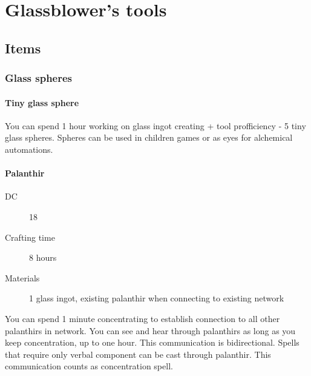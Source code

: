 \chapter{Glassblower's tools}

\section{Items}

\subsection{Glass spheres}

\subsubsection{Tiny glass sphere}

You can spend 1 hour working on glass ingot creating \sleightofhands + tool profficiency - 5 tiny glass spheres. Spheres can be used in children games or as eyes for alchemical automations.

\subsubsection{Palanthir}

\begin{description}
\item [DC] 18 \arcana
\item [Crafting time] 8 hours
\item [Materials] 1 glass ingot, existing palanthir when connecting to existing network
\end{description}

You can spend 1 minute concentrating to establish connection to all other palanthirs in network. You can see and hear through palanthirs as long as you keep concentration, up to one hour. This communication is bidirectional. Spells that require only verbal component can be cast through palanthir. This communication counts as concentration spell.


